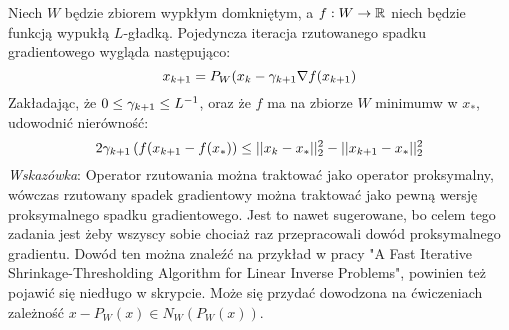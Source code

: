 \documentclass[10pt,a4paper,draft]{report}
\begin{document}
\begin{problem}
Niech $W$ będzie zbiorem wypkłym domkniętym, a $f: W \rightarrow \mathbb{R}$ niech będzie funkcją wypukłą $L$-gładką. Pojedyncza iteracja rzutowanego spadku gradientowego wygląda następująco:
\[
x_{k+1} = P_W(x_k - \gamma_{k+1} \nabla f(x_{k+1})
\]
Zakładając, że $0 \leq \gamma_{k+1} \leq L^{-1}$, oraz że $f$ ma na zbiorze $W$ minimumw w $x_*$, udowodnić nierówność: 
\[
2\gamma_{k+1} \left( f(x_{k+1} - f(x_*) \right) \leq ||x_{k} - x_*||_2^2 - ||x_{k+1} - x_*||_2^2 
\]
\textit{Wskazówka}: Operator rzutowania można traktować jako operator proksymalny, wówczas rzutowany spadek gradientowy można traktować jako pewną wersję proksymalnego spadku gradientowego. Jest to nawet sugerowane, bo celem tego zadania jest żeby wszyscy sobie chociaż raz przepracowali dowód proksymalnego gradientu. Dowód ten można znaleźć na przykład w pracy "A Fast Iterative Shrinkage-Thresholding Algorithm for Linear Inverse Problems", powinien też pojawić się niedługo w skrypcie. Może się przydać dowodzona na ćwiczeniach zależność $x - P_W(x) \in N_W(P_W(x))$.
\end{problem}
\end{document}
